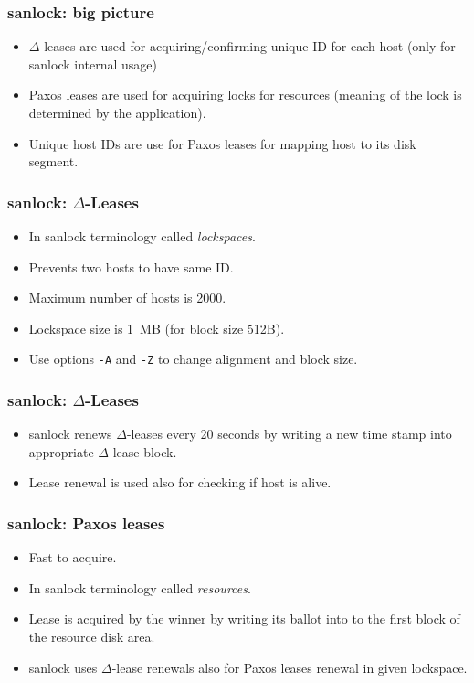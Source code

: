 \documentclass[10pt,utf8]{beamer}
\begin{document}
\begin{frame}
  \frametitle{sanlock: big picture}
  \begin{itemize}
    \item $\Delta$-leases are used for acquiring/confirming unique ID for each host (only for sanlock internal usage)
    \item Paxos leases are used for acquiring locks for resources (meaning of the lock is determined by the application).
    \item Unique host IDs are use for Paxos leases for mapping host to its disk segment.
  \end{itemize}
\end{frame}

\begin{frame}
    \frametitle{sanlock: $\Delta$-Leases}
  \begin{itemize}
    \item In sanlock terminology called \textit{lockspaces}.
    \item Prevents two hosts to have same ID.
    \item Maximum number of hosts is 2000.
    \item Lockspace size is 1~MB (for block size 512B).
    \item Use options \texttt{-A} and \texttt{-Z} to change alignment and block size.
  \end{itemize}
\end{frame}

\begin{frame}
  \frametitle{sanlock: $\Delta$-Leases}
  \begin{itemize}
    \item sanlock renews $\Delta$-leases every 20 seconds by writing a new time stamp into appropriate $\Delta$-lease block.
    \item Lease renewal is used also for checking if host is alive.
  \end{itemize}
\end{frame}

\begin{frame}
  \frametitle{sanlock: Paxos leases}
  \begin{itemize}
    \item Fast to acquire.
    \item In sanlock terminology called \textit{resources}.
    \item Lease is acquired by the winner by writing its ballot into to the first block of the resource disk area.
    \item sanlock uses $\Delta$-lease renewals also for Paxos leases renewal in given lockspace.
  \end{itemize}
\end{frame}
\end{document}
